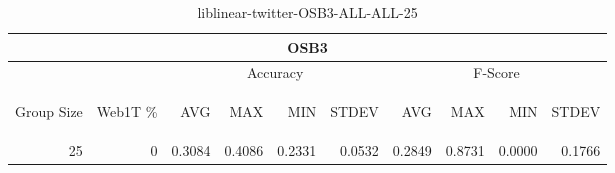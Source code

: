 \begin{center}
\begin{table}[htbp]
\begin{tabular}{ | r | r | r | r | r | r | r | r | r | r |}
\hline
\multicolumn{10}{|c|}{OSB3}\\
\hline
 & & \multicolumn{4}{|c|}{Accuracy} & \multicolumn{4}{|c|}{F-Score}\\ \cline{3-10}
\begin{sideways}Group Size\end{sideways} & \begin{sideways}Web1T \%\end{sideways} & \begin{sideways}AVG\end{sideways} & \begin{sideways}MAX\end{sideways} & \begin{sideways}MIN\end{sideways} & \begin{sideways}STDEV\end{sideways} & \begin{sideways}AVG\end{sideways} & \begin{sideways}MAX\end{sideways} & \begin{sideways}MIN\end{sideways} & \begin{sideways}STDEV\end{sideways}\\
\hline
\multirow{0}{*}{25}
 & 0 & 0.3084 & 0.4086 & 0.2331 & 0.0532 & 0.2849 & 0.8731 & 0.0000 & 0.1766\\ \cline{2-10}
\hline
\end{tabular}
\caption{liblinear-twitter-OSB3-ALL-ALL-25}
\label{table:liblinear-twitter-OSB3-ALL-ALL-25}
\end{table}
\end{center}

